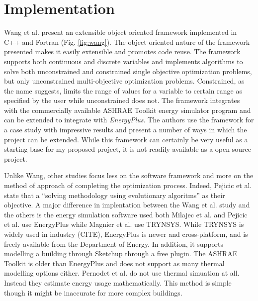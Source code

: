 \section{Implementation}\label{sec:implementation}
 Wang et al. \cite{Wang2005b} present an extensible object oriented framework implemented in C++ and Fortran (Fig. \ref{fig:wang}). The object oriented nature of the framework presented makes it easily extensible and promotes code reuse. The framework supports both continuous and discrete variables and implements algorithms to solve both unconstrained and constrained single objective optimization problems, but only unconstrained multi-objective optimization problems. Constrained, as the name suggests, limits the range of values for a variable to certain range as specified by the user while unconstrained does not. The framework integrates with the commercially available ASHRAE Toolkit energy simulator program and can be extended to integrate with {\em EnergyPlus}. The authors use the framework for a case study with impressive results and present a number of ways in which the project can be extended. While this framework can certainly be very useful as a starting base for my proposed project, it is not readily available as a open source project. 

Unlike Wang, other studies focus less on the software framework and more on the method of approach of completing the optimization process. Indeed, Pejicic et al. state that a ``solving methodology using evolutionary algoritms'' as their objective. A major difference in implentation between the Wang et al. study and the others is the energy simulation software used \textemdash both Milajec et al. and Pejicic et al. use EnergyPlus while Magnier et al. use TRYNSYS.  While TRYNSYS is widely used in industry (CITE), EnergyPlus is newer and cross-platform, and is freely available from the Department of Energy. In addition, it supports modelling a building through Sketchup through a free plugin. The ASHRAE Toolkit is older than EnergyPlus and does not support as many thermal modelling options either. Pernodet et al. do not use thermal simuation at all. Instead they estimate energy usage mathematically. This method is simple though it might be inaccurate for more complex buildings.

